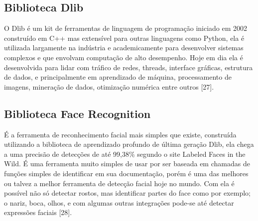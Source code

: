 \subsection{Biblioteca Dlib}
O Dlib é um kit de ferramentas de linguagem de programação iniciado em 2002 construído em C++ mas extensível para outras linguagens como Python, ela é utilizada largamente na indústria e academicamente para desenvolver sistemas complexos e que envolvam computação de alto desempenho. Hoje em dia ela é desenvolvida para lidar com tráfico de redes, threads, interface gráficas, estrutura de dados, e principalmente em aprendizado de máquina, processamento de imagens, mineração de dados, otimização numérica entre outros [27].
\subsection{Biblioteca Face Recognition}
É a ferramenta de reconhecimento facial mais simples que existe, construída utilizando a biblioteca de aprendizado profundo de última geração Dlib, ela chega a uma precisão de detecções de até 99,38\% segundo o site Labeled Faces in the Wild. É uma ferramenta muito simples de usar por ser baseada em chamadas de funções simples de identificar em sua documentação, porém é uma das melhores ou talvez a melhor ferramenta de detecção facial hoje no mundo.
Com ela é possível não só detectar rostos, mas identificar partes do face como por exemplo; o nariz, boca, olhos, e com algumas outras integrações pode-se até detectar expressões faciais [28].

